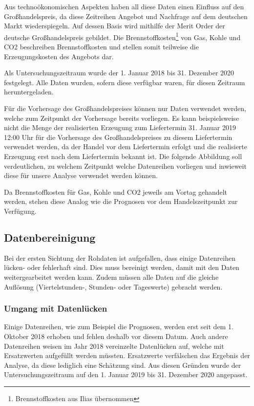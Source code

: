 Aus technoökonomischen Aspekten haben all diese Daten einen Einfluss auf den Großhandelspreis, da diese Zeitreihen Angebot und Nachfrage auf dem deutschen Markt wiederspiegeln. Auf dessen Basis wird mithilfe der Merit Order der deutsche Großhandelspreis gebildet. Die Brennstoffkosten\footnote{Brennstoffkosten aus Ilias übernommen} von Gas, Kohle und CO2 beschreiben Brennstoffkosten und stellen somit teilweise die Erzeugungskosten des Angebots dar.

Als Untersuchungszeitraum wurde der 1. Januar 2018 bis 31. Dezember 2020 festgelegt. Alle Daten wurden, sofern diese verfügbar waren, für diesen Zeitraum heruntergeladen.

Für die Vorhersage des Großhandelspreises können nur Daten verwendet werden, welche zum Zeitpunkt der Vorhersage bereits vorliegen. Es kann beispielsweise nicht die Menge der realisierten Erzeugung zum Liefertermin 31. Januar 2019 12:00 Uhr für die Vorhersage des Großhandelspreises zu diesem Liefertermin verwendet werden, da der Handel vor dem Liefertermin erfolgt und die realisierte Erzeugung erst nach dem Liefertermin bekannt ist. Die folgende Abbildung soll verdeutlichen, zu welchem Zeitpunkt welche Datenreihen vorliegen und inwieweit diese für unsere Analyse verwendet werden können.


Da Brennstoffkosten für Gas, Kohle und CO2 jeweils am Vortag gehandelt werden, stehen diese Analog wie die Prognosen vor dem Handelszeitpunkt zur Verfügung.

\subsection{Datenbereinigung}
Bei der ersten Sichtung der Rohdaten ist aufgefallen, dass einige Datenreihen lücken- oder fehlerhaft sind. Dies muss bereinigt werden, damit mit den Daten weitergearbeitet werden kann. Zudem müssen alle Daten auf die gleiche Auflösung (Viertelstunden-, Stunden- oder Tageswerte) gebracht werden.

\subsubsection*{Umgang mit Datenlücken}
Einige Datenreihen, wie zum Beispiel die Prognosen, werden erst seit dem 1. Oktober 2018 erhoben und fehlen deshalb vor diesem Datum. Auch andere Datenreihen weisen im Jahr 2018 vereinzelte Datenlücken auf, welche mit Ersatzwerten aufgefüllt werden müssten. Ersatzwerte verfälschen das Ergebnis der Analyse, da diese lediglich eine Schätzung sind. Aus diesen Gründen wurde der Untersuchungszeitraum auf den 1. Januar 2019 bis 31. Dezember 2020 angepasst.

